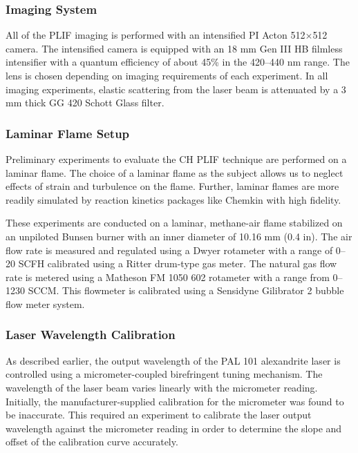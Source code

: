 \subsubsection{Imaging System}
\label{subsubsec:plif-imaging-system}

All of the PLIF imaging is performed with an intensified PI Acton 512\(\times\)512 camera.
The intensified camera is equipped with an 18 mm Gen III HB filmless intensifier with a quantum efficiency of about 45\% in the 420--440 nm range.
The lens is chosen depending on imaging requirements of each experiment.
In all imaging experiments, elastic scattering from the laser beam is attenuated by a 3 mm thick GG 420 Schott Glass filter.

\subsubsection{Laminar Flame Setup}
\label{subsubsec:plif-laminar-flame-setup}

Preliminary experiments to evaluate the CH PLIF technique are performed on a laminar flame.
The choice of a laminar flame as the subject allows us to neglect effects of strain and turbulence on the flame.
Further, laminar flames are more readily simulated by reaction kinetics packages like Chemkin with high fidelity.

These experiments are conducted on a laminar, methane-air flame stabilized on an unpiloted Bunsen burner with an inner diameter of 10.16 mm (0.4 in).
The air flow rate is measured and regulated using a Dwyer rotameter with a range of 0--20 SCFH calibrated using a Ritter drum-type gas meter.
The natural gas flow rate is metered using a Matheson FM 1050 602 rotameter with a range from 0--1230 SCCM.
This flowmeter is calibrated using a Sensidyne Gilibrator 2 bubble flow meter system.

\subsubsection{Laser Wavelength Calibration}
\label{subsubsec:plif-laser-wavelength-calibration}



As described earlier, the output wavelength of the PAL 101 alexandrite laser is controlled using a micrometer-coupled birefringent tuning mechanism.
The wavelength of the laser beam varies linearly with the micrometer reading.
Initially, the manufacturer-supplied calibration for the micrometer was found to be inaccurate.
This required an experiment to calibrate the laser output wavelength against the micrometer reading in order to determine the slope and offset of the calibration curve accurately.

